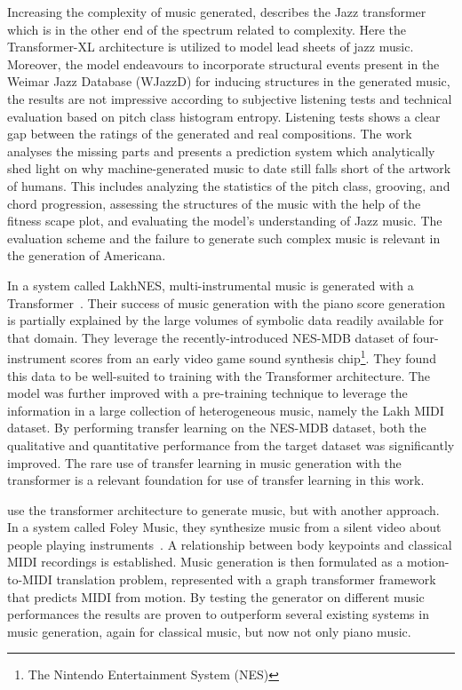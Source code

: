 \documentclass{IEEEtran}
\begin{document}
Increasing the complexity of music generated, \citeauthor{wu2020jazz} describes
the Jazz transformer which is in
the other end of the spectrum related to complexity. Here the
Transformer-XL architecture is utilized to model lead sheets of jazz music.
Moreover, the model endeavours to incorporate structural events present in the
Weimar Jazz Database (WJazzD) for inducing structures in the generated music, 
the results are not impressive according to subjective listening tests and technical 
evaluation based on pitch class histogram entropy.
Listening tests shows a clear gap between the ratings of the generated and
real compositions. The work analyses the missing parts and presents a
prediction system which analytically shed light on why
machine-generated music to date still falls short of the artwork of humans.
This includes analyzing the statistics of the pitch class, grooving, and
chord progression, assessing the structures of the music with the help of
the fitness scape plot, and evaluating the model’s understanding of Jazz
music. The evaluation scheme and the failure to generate such complex music
is relevant in the generation of Americana.

In a system called LakhNES,
multi-instrumental music is generated with a Transformer~\cite{donahue2019lakhnes}.
Their success of music generation with the piano score generation is
partially explained by the large volumes of symbolic data readily available
for that domain. They leverage the recently-introduced NES-MDB dataset of
four-instrument scores from an early video game sound synthesis
chip\footnote{The Nintendo Entertainment System (NES)}. They found this data
to be well-suited to training with the Transformer architecture. The model
was further improved with a pre-training technique to leverage the
information in a large collection of heterogeneous music, namely the Lakh
MIDI dataset. By performing transfer learning on the NES-MDB dataset, both
the qualitative and quantitative performance from the target dataset was
significantly improved. The rare use of transfer learning in music generation
with the transformer is a relevant foundation for use of transfer learning in
this work.

\citeauthor{gan2020foley} use the transformer architecture to generate music,
but with another approach. In a system called Foley Music, they synthesize
music from a silent video about people playing
instruments~\cite{gan2020foley}. A relationship between body keypoints and
classical MIDI recordings is established. Music generation is then formulated
as a motion-to-MIDI translation problem, represented with a graph transformer
framework that predicts MIDI from motion. By testing the generator on
different music performances the results are proven to outperform several
existing systems in music generation, again for classical music, but now not only piano music.
\end{document}
